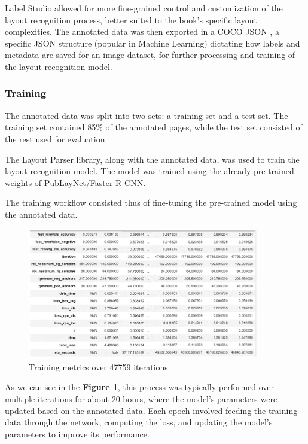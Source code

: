 Label Studio allowed for more fine-grained control and customization of the layout recognition process, better suited to the book's specific layout complexities.
The annotated data was then exported in a COCO JSON \parencite{cocodataset}, a specific JSON structure (popular in Machine Learning) dictating how labels and metadata are saved for an image dataset, for further processing and training of the layout recognition model.

\subsubsection{Training}
The annotated data was split into two sets: a training set and a test set. The training set contained 85\% of the annotated pages, while the test set consisted of the rest used for evaluation.

The Layout Parser library, along with the annotated data, was used to train the layout recognition model. The model was trained using the already pre-trained weights of PubLayNet/Faster R-CNN. 

The training workflow consisted thus of fine-tuning the pre-trained model using the annotated data. \\[0.3cm]

\begin{figure}[H]
    \centering
    \includegraphics[width=0.9\textwidth]{Images/metrics.png}
    \caption{Training metrics over 47759 iterations}
    \label{fig:metrics}
\end{figure}

As we can see in the \textbf{Figure \ref{fig:metrics}}, this process was typically performed over multiple iterations for about 20 hours, where the model's parameters were updated based on the annotated data. Each epoch involved feeding the training data through the network, computing the loss, and updating the model's parameters to improve its performance.

